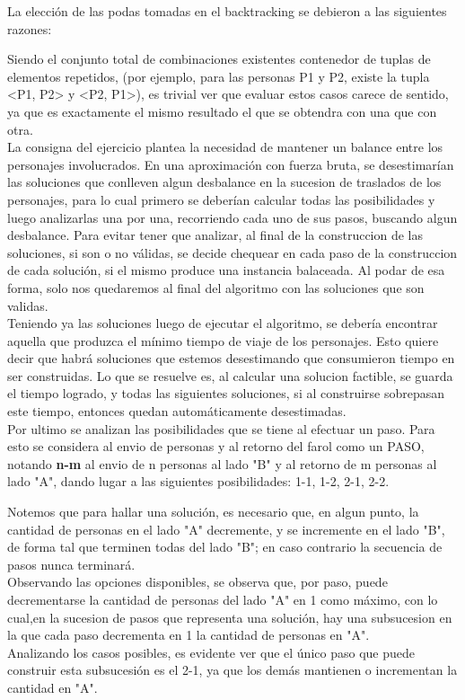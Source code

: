 La elección de las podas tomadas en el backtracking se debieron a las siguientes razones:

Siendo el conjunto total de combinaciones existentes contenedor de tuplas de elementos repetidos, (por ejemplo, para las personas P1 y P2, existe la tupla <P1, P2> y <P2, P1>), es trivial ver que evaluar estos casos carece de sentido, ya que es exactamente el mismo resultado el que se obtendra con una que con otra.\\

La consigna del ejercicio plantea la necesidad de mantener un balance entre los personajes involucrados. En una aproximación con fuerza bruta, se desestimarían las soluciones que conlleven algun desbalance en la sucesion de traslados de los personajes, para lo cual primero se deberían calcular todas las posibilidades y luego analizarlas una por una, recorriendo cada uno de sus pasos, buscando algun desbalance. Para evitar tener que analizar, al final de la construccion de las soluciones, si son o no válidas, se decide chequear en cada paso de la construccion de cada solución, si el mismo produce una instancia balaceada. Al podar de esa forma, solo nos quedaremos al final del algoritmo con las soluciones que son validas.\\

Teniendo ya las soluciones luego de ejecutar el algoritmo, se debería encontrar aquella que produzca el mínimo tiempo de viaje de los personajes. Esto quiere decir que habrá soluciones que estemos desestimando que consumieron tiempo en ser construidas. Lo que se resuelve es, al calcular una solucion factible, se guarda el tiempo logrado, y todas las siguientes soluciones, si al construirse sobrepasan este tiempo, entonces quedan automáticamente desestimadas.\\

Por ultimo se analizan las posibilidades que se tiene al efectuar un paso. Para esto se considera al envio de personas y al retorno del farol como un PASO, notando \textbf{n-m} al envio de n personas al lado "B" y al retorno de m personas al lado "A", dando lugar a las siguientes posibilidades: {1-1, 1-2, 2-1, 2-2}.

Notemos que para hallar una solución, es necesario que, en algun punto, la cantidad de personas en el lado "A" decremente, y se incremente en el lado "B", de forma tal que terminen todas del lado "B"; en caso contrario la secuencia de pasos nunca terminará.\\ Observando las opciones disponibles, se observa que, por paso, puede decrementarse la cantidad de personas del lado "A" en 1 como máximo, con lo cual,en la sucesion de pasos que representa una solución, hay una subsucesion en la que cada paso decrementa en 1 la cantidad de personas en "A".\\ Analizando los casos posibles, es evidente ver que el único paso que puede construir esta subsucesión es el 2-1, ya que los demás mantienen o incrementan la cantidad en "A".\\\\

